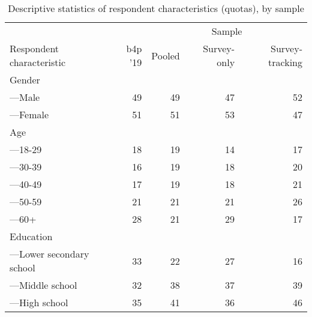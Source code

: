 \begin{table}[h!]
\centering
\caption{Descriptive statistics of respondent characteristics (quotas), by sample} 
\label{tab:quotabalance}
\begingroup\small
\begin{tabular}{lrrrr}
  \hline
  & & \multicolumn{3}{c}{Sample}  \\\cmidrule(r){3-5} Respondent characteristic & b4p '19 & Pooled & Survey-only  & Survey-tracking\\ \hline
Gender &  &  &  &  \\ 
  ---Male & 49 & 49 & 47 & 52 \\ 
  ---Female & 51 & 51 & 53 & 47 \\ 
  Age &  &  &  &  \\ 
  ---18-29 & 18 & 19 & 14 & 17 \\ 
  ---30-39 & 16 & 19 & 18 & 20 \\ 
  ---40-49 & 17 & 19 & 18 & 21 \\ 
  ---50-59 & 21 & 21 & 21 & 26 \\ 
  ---60+ & 28 & 21 & 29 & 17 \\ 
  Education &  &  &  &  \\ 
  ---Lower secondary school & 33 & 22 & 27 & 16 \\ 
  ---Middle school & 32 & 38 & 37 & 39 \\ 
  ---High school & 35 & 41 & 36 & 46 \\ 
   \hline
\end{tabular}
\endgroup
\end{table}
